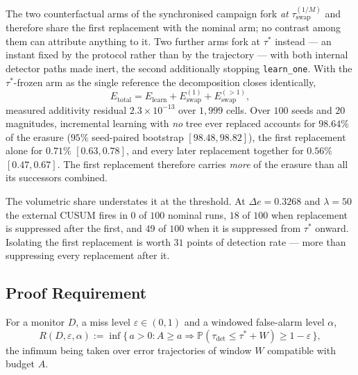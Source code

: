 \begin{remark}\label{rem:first_swap}
  The two counterfactual arms of the synchronised campaign fork \emph{at}
  $\tau_{\mathrm{swap}}^{(1/M)}$ and therefore share the first replacement with
  the nominal arm; no contrast among them can attribute anything to it. Two
  further arms fork at $\tau^*$ instead --- an instant fixed by the protocol
  rather than by the trajectory --- with both internal detector paths made
  inert, the second additionally stopping \texttt{learn\_one}. With the
  $\tau^*$-frozen arm as the single reference the decomposition closes
  identically,
  \[
    E_{\mathrm{total}} = E_{\mathrm{learn}} + E_{\mathrm{swap}}^{(1)}
                       + E_{\mathrm{swap}}^{(>1)} ,
  \]
  measured additivity residual $2.3\times10^{-13}$ over $1{,}999$ cells. Over
  $100$ seeds and $20$ magnitudes, incremental learning with \emph{no} tree ever
  replaced accounts for $98.64\%$ of the erasure ($95\%$ seed-paired bootstrap
  $[98.48, 98.82]$), the first replacement alone for $0.71\%$
  $[0.63, 0.78]$, and every later replacement together for $0.56\%$
  $[0.47, 0.67]$. The first replacement therefore carries \emph{more} of the
  erasure than all its successors combined.

  The volumetric share understates it at the threshold. At $\Delta e = 0.3268$
  and $\lambda = 50$ the external CUSUM fires in $0$ of $100$ nominal runs, $18$
  of $100$ when replacement is suppressed after the first, and $49$ of $100$
  when it is suppressed from $\tau^*$ onward. Isolating the first replacement is
  worth $31$ points of detection rate --- more than suppressing every
  replacement after it.
\end{remark}

\subsection{Proof Requirement}\label{sec:requirement}

\begin{definition}\label{def:requirement}
  For a monitor $D$, a miss level $\varepsilon \in (0,1)$ and a windowed
  false-alarm level $\alpha$,
  \[
    R(D, \varepsilon, \alpha) := \inf\bigl\{\, a > 0 :
      A \ge a \Rightarrow
      \mathbb{P}(\tau_{\mathrm{det}} \le \tau^* + W) \ge 1 - \varepsilon
      \,\bigr\},
  \]
  the infimum being taken over error trajectories of window $W$ compatible
  with budget $A$.
\end{definition}

